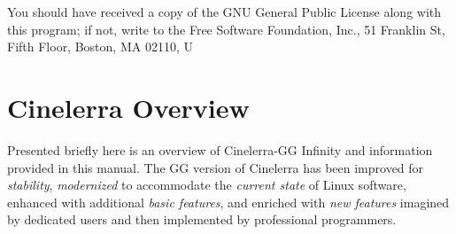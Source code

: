 You should have received a copy of the GNU General Public License along with this program;
if not, write to the Free Software Foundation, Inc., 51 Franklin St, Fifth Floor, Boston, MA 02110, U

\section*{Cinelerra Overview}%
\label{sec:cinelerra_overview}

Presented briefly here is an overview of Cinelerra-GG Infinity and information provided in this manual. 
The GG version of Cinelerra has been improved for \emph{stability}, \emph{modernized} to accommodate the
\emph{current state} of Linux software, enhanced with additional \emph{basic features}, and enriched with \emph{new features} imagined by dedicated users and then implemented by professional programmers.

